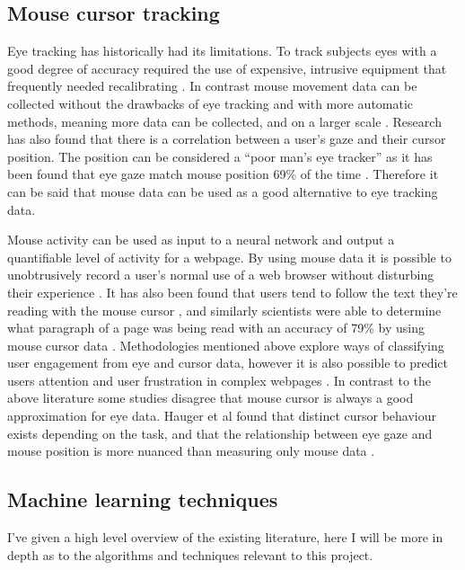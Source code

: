 \documentclass{article}
\begin{document}
\subsection{Mouse cursor tracking}
Eye tracking has historically had its limitations. 
To track subjects eyes with a good degree of accuracy required the use of expensive, intrusive equipment that frequently needed recalibrating \cite{richardson2004eye}. 
In contrast mouse movement data can be collected without the drawbacks of eye tracking and with more automatic methods, meaning more data can be collected, and on a larger scale \cite{demvsar2017quantifying}.
Research has also found that there is a correlation between a user’s gaze and their cursor position. 
The position can be considered a ``poor man’s eye tracker'' as it has been found that eye gaze match mouse position 69\% of the time \cite{cooke2006mouse}. 
Therefore it can be said that mouse data can be used as a good alternative to eye tracking data.

Mouse activity can be used as input to a neural network and output a quantifiable level of activity for a webpage. 
By using mouse data it is possible to unobtrusively record a user’s normal use of a web browser without disturbing their experience \cite{goecks2000learning}.
It has also been found that users tend to follow the text they’re reading with the mouse cursor \cite{liu2007detecting}, and similarly scientists were able to determine what paragraph of a page was being read with an accuracy of 79\% by using mouse cursor data \cite{hauger2011using}. 
Methodologies mentioned above explore ways of classifying user engagement from eye and cursor data, however it is also possible to predict users attention and user frustration in complex webpages \cite{navalpakkam2012mouse}.
In contrast to the above literature some studies disagree that mouse cursor is always a good approximation for eye data. 
Hauger et al found that distinct cursor behaviour exists depending on the task, and that the relationship between eye gaze and mouse position is more nuanced than measuring only mouse data \cite{huang2012user}.

\subsection{Machine learning techniques}
I've given a high level overview of the existing literature, here I will be more in depth as to the algorithms and techniques relevant to this project.
\end{document}
